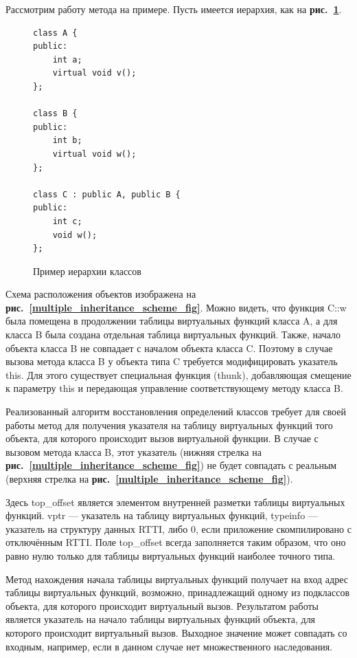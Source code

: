 \documentclass[a4paper,12pt,russian]{article}
\newcommand{\picref}[1]{\textbf{рис.~\ref{#1}}}
\newcommand{\code}[1]{\textsf{#1}}
\begin{document}
Рассмотрим работу метода на примере. Пусть имеется иерархия, как на \picref{vtable_start_ex_lst}.
\begin{figure}
\begin{lstlisting}
class A {
public:
    int a;
    virtual void v();
};

class B {
public:
    int b;
    virtual void w();
};

class C : public A, public B {
public:
    int c;
    void w();
};
\end{lstlisting}
\caption{Пример иерархии классов}
\label{vtable_start_ex_lst}
\end{figure}
Схема расположения объектов изображена на \picref{multiple_inheritance_scheme_fig}.
Можно видеть, что функция \code{C::w} была помещена в продолжении таблицы виртуальных функций класса \code{A}, а для класса \code{B} была создана отдельная таблица виртуальных функций.
Также, начало объекта класса \code{B} не совпадает с началом объекта класса \code{C}.
Поэтому в случае вызова метода класса \code{B} у объекта типа \code{C} требуется модифицировать указатель \code{this}.
Для этого существует специальная функция (\code{thunk}), добавляющая смещение к параметру \code{this} и передающая управление соответствующему методу класса \code{B}.

Реализованный алгоритм восстановления определений классов требует для своей работы метод для получения указателя на таблицу виртуальных функций того объекта, для которого происходит вызов виртуальной функции.
В случае с вызовом метода класса \code{B}, этот указатель (нижняя стрелка на \picref{multiple_inheritance_scheme_fig}) не будет совпадать с реальным (верхняя стрелка на \picref{multiple_inheritance_scheme_fig}).

Здесь \code{top\_offset} является элементом внутренней разметки таблицы виртуальных функций.
\code{vptr} --- указатель на таблицу виртуальных функций, \code{typeinfo} --- указатель на структуру данных \code{RTTI}, либо $0$, если приложение скомпилировано с отключённым \code{RTTI}.
Поле \code{top\_offset} всегда заполняется таким образом, что оно равно нулю только для таблицы виртуальных функций наиболее точного типа.

Метод нахождения начала таблицы виртуальных функций получает на вход адрес таблицы виртуальных функций, возможно, принадлежащий одному из подклассов объекта, для которого происходит виртуальный вызов.
Результатом работы является указатель на начало таблицы виртуальных функций объекта, для которого происходит виртуальный вызов.
Выходное значение может совпадать со входным, например, если в данном случае нет множественного наследования.
\end{document}
